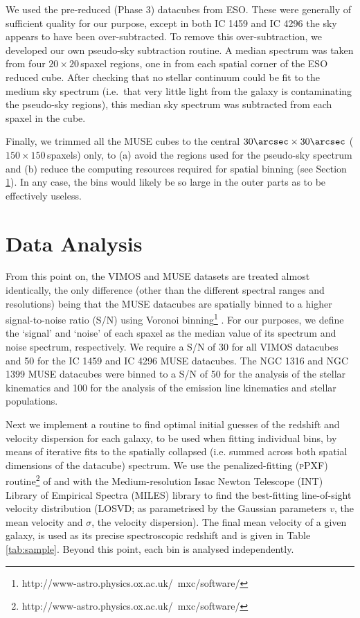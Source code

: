 \documentclass[a4paper,fleqn,usenatbib]{mnras}
\begin{document}
		We used the pre-reduced (Phase 3) datacubes from ESO. These were generally of sufficient quality for our purpose, except in both IC 1459 and IC 4296 the sky appears to have been over-subtracted. To remove this over-subtraction, we developed our own pseudo-sky subtraction routine. A median spectrum was taken from four $20 \times 20$\,spaxel regions, one in from each spatial corner of the ESO reduced cube. After checking that no stellar continuum could be fit to the medium sky spectrum (i.e.\ that very little light from the galaxy is contaminating the pseudo-sky regions), this median sky spectrum was subtracted from each spaxel in the cube. 

		Finally, we trimmed all the MUSE cubes to the central $30\arcsec \times 30\arcsec$ ($150 \times 150$\,spaxels) only, to (a) avoid the regions used for the pseudo-sky spectrum and (b) reduce the computing resources required for spatial binning (see Section \ref{sec:analysis}). In any case, the bins would likely be so large in the outer parts as to be effectively useless.

\section{Data Analysis}
	\label{sec:analysis}
	From this point on, the VIMOS and MUSE datasets are treated almost identically, the only difference (other than the different spectral ranges and resolutions) being that the MUSE datacubes are spatially binned to a higher signal-to-noise ratio (S/N) using Voronoi binning\footnote{http://www-astro.physics.ox.ac.uk/~mxc/software/} \citep{Cappellari2003}. For our purposes, we define the `signal' and `noise' of each spaxel as the median value of its spectrum and noise spectrum, respectively. We require a S/N of 30 for all VIMOS datacubes and 50 for the IC 1459 and IC 4296 MUSE datacubes. The NGC 1316 and NGC 1399 MUSE datacubes were binned to a S/N of 50 for the analysis of the stellar kinematics and 100 for the analysis of the emission line kinematics and stellar populations.

	Next we implement a routine to find optimal initial guesses of the redshift and velocity dispersion for each galaxy, to be used when fitting individual bins, by means of iterative fits to the spatially collapsed (i.e. summed across both spatial dimensions of the datacube) spectrum. We use the penalized-fitting (\textsc{pPXF}) routine\footnote{http://www-astro.physics.ox.ac.uk/~mxc/software/} of \citet{Cappellari2004} and \citet{Cappellari2016a} with the Medium-resolution Issac Newton Telescope (INT) Library of Empirical Spectra (MILES) library \citep{Sanchez-Blazquez2006, Falcon-Barroso2011a} to find the best-fitting line-of-sight velocity distribution (LOSVD; as parametrised by the Gaussian parameters $v$, the mean velocity and $\sigma$, the velocity dispersion). The final mean velocity of a given galaxy, is used as its precise spectroscopic redshift and is given in Table \ref{tab:sample}. Beyond this point, each bin is analysed independently.
\end{document}
